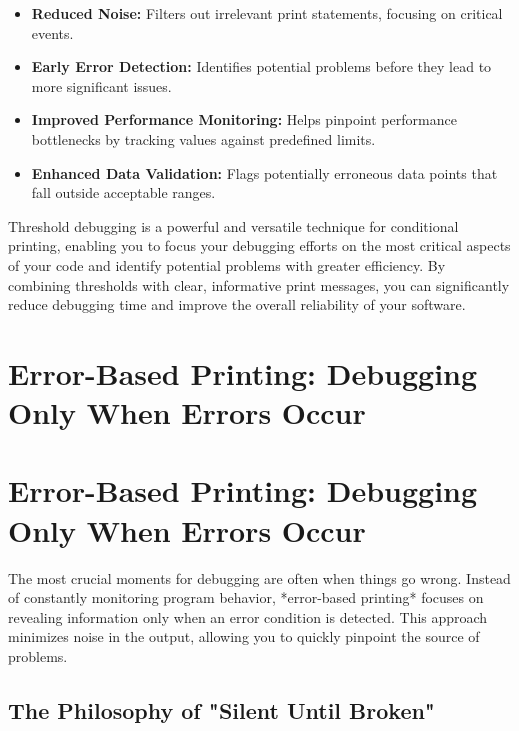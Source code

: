\documentclass{article}
\begin{document}
{{{\begin{itemize}
    \item \textbf{Reduced Noise:}  Filters out irrelevant print statements, focusing on critical events.
    \item \textbf{Early Error Detection:}  Identifies potential problems before they lead to more significant issues.
    \item \textbf{Improved Performance Monitoring:}  Helps pinpoint performance bottlenecks by tracking values against predefined limits.
    \item \textbf{Enhanced Data Validation:} Flags potentially erroneous data points that fall outside acceptable ranges.
\end{itemize}

Threshold debugging is a powerful and versatile technique for conditional printing, enabling you to focus your debugging efforts on the most critical aspects of your code and identify potential problems with greater efficiency. By combining thresholds with clear, informative print messages, you can significantly reduce debugging time and improve the overall reliability of your software.

\newpage

\section*{Error-Based Printing: Debugging Only When Errors Occur} %
\label{chapter-5-7-Error-Based_Printing__Debugging_Only_Whe}

\section*{Error-Based Printing: Debugging Only When Errors Occur}

The most crucial moments for debugging are often when things go wrong. Instead of constantly monitoring program behavior, *error-based printing* focuses on revealing information only when an error condition is detected. This approach minimizes noise in the output, allowing you to quickly pinpoint the source of problems.

\subsection*{The Philosophy of "Silent Until Broken"}

}}}
\end{document}
